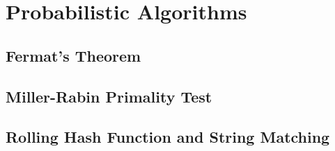 \section{Probabilistic Algorithms}
\subsection*{Fermat's Theorem}
\lipsum[1][1-2]
\subsection*{Miller-Rabin Primality Test}
\lipsum[1][1-2]
\subsection*{Rolling Hash Function and String Matching}
\lipsum[1][1-2]

